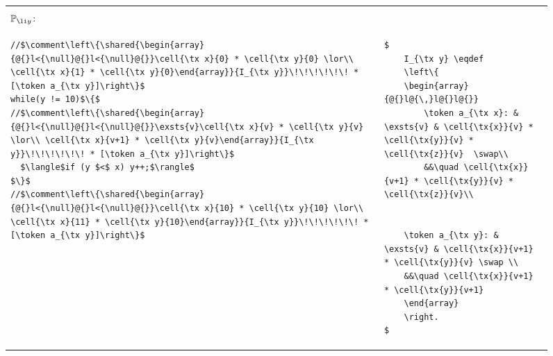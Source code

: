 \begin{figure}
\begin{tabular}{@{} l @{\hspace{15pt}} l@{\ }}
&\vspace{-5pt}\\
{$\mathbb{P}_{\li y}$:}&  \vspace{-10pt}\\
\begin{lstlisting}
//$\comment\left\{\shared{\begin{array}{@{}l<{\null}@{}l<{\null}@{}}\cell{\tx x}{0} * \cell{\tx y}{0} \lor\\ \cell{\tx x}{1} * \cell{\tx y}{0}\end{array}}{I_{\tx y}}\!\!\!\!\!\! * [\token a_{\tx y}]\right\}$
while(y != 10)$\{$
//$\comment\left\{\shared{\begin{array}{@{}l<{\null}@{}l<{\null}@{}}\exsts{v}\cell{\tx x}{v} * \cell{\tx y}{v} \lor\\ \cell{\tx x}{v+1} * \cell{\tx y}{v}\end{array}}{I_{\tx y}}\!\!\!\!\!\! * [\token a_{\tx y}]\right\}$
  $\langle$if (y $<$ x) y++;$\rangle$ 
$\}$
//$\comment\left\{\shared{\begin{array}{@{}l<{\null}@{}l<{\null}@{}}\cell{\tx x}{10} * \cell{\tx y}{10} \lor\\ \cell{\tx x}{11} * \cell{\tx y}{10}\end{array}}{I_{\tx y}}\!\!\!\!\!\! * [\token a_{\tx y}]\right\}$
\end{lstlisting}
&
\begin{lstlisting}
$
	I_{\tx y} \eqdef 
	\left\{
	\begin{array}{@{}l@{\,}l@{}l@{}} 
		\token a_{\tx x}: & \exsts{v} & \cell{\tx{x}}{v} * \cell{\tx{y}}{v} * \cell{\tx{z}}{v}  \swap\\
		&&\quad \cell{\tx{x}}{v+1} * \cell{\tx{y}}{v} * \cell{\tx{z}}{v}\\
		
    
    \token a_{\tx y}: & \exsts{v} & \cell{\tx{x}}{v+1} * \cell{\tx{y}}{v} \swap \\
    &&\quad \cell{\tx{x}}{v+1} * \cell{\tx{y}}{v+1} 
	\end{array}
	\right.
$
\end{lstlisting}\vspace{5pt}\\\hline


\end{tabular}
\end{figure}
